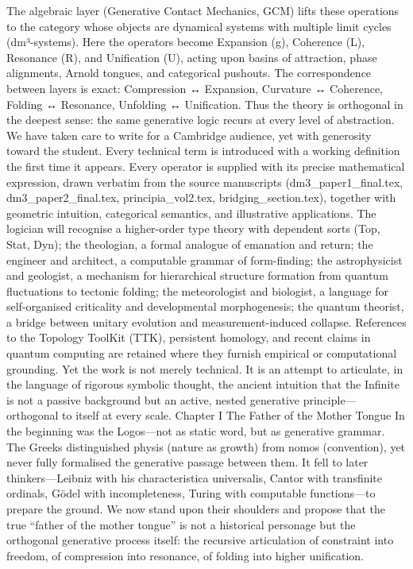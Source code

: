 The algebraic layer (Generative Contact Mechanics, GCM) lifts these operations to the category whose objects are dynamical systems with multiple limit cycles (dm³-systems). Here the operators become Expansion (g), Coherence (L), Resonance (R), and Unification (U), acting upon basins of attraction, phase alignments, Arnold tongues, and categorical pushouts. The correspondence between layers is exact: Compression ↔ Expansion, Curvature ↔ Coherence, Folding ↔ Resonance, Unfolding ↔ Unification. Thus the theory is orthogonal in the deepest sense: the same generative logic recurs at every level of abstraction.
We have taken care to write for a Cambridge audience, yet with generosity toward the student. Every technical term is introduced with a working definition the first time it appears. Every operator is supplied with its precise mathematical expression, drawn verbatim from the source manuscripts (dm3_paper1_final.tex, dm3_paper2_final.tex, principia_vol2.tex, bridging_section.tex), together with geometric intuition, categorical semantics, and illustrative applications. The logician will recognise a higher-order type theory with dependent sorts (Top, Stat, Dyn); the theologian, a formal analogue of emanation and return; the engineer and architect, a computable grammar of form-finding; the astrophysicist and geologist, a mechanism for hierarchical structure formation from quantum fluctuations to tectonic folding; the meteorologist and biologist, a language for self-organised criticality and developmental morphogenesis; the quantum theorist, a bridge between unitary evolution and measurement-induced collapse.
References to the Topology ToolKit (TTK), persistent homology, and recent claims in quantum computing are retained where they furnish empirical or computational grounding. Yet the work is not merely technical. It is an attempt to articulate, in the language of rigorous symbolic thought, the ancient intuition that the Infinite is not a passive background but an active, nested generative principle—orthogonal to itself at every scale.
Chapter I
The Father of the Mother Tongue
In the beginning was the Logos—not as static word, but as generative grammar. The Greeks distinguished physis (nature as growth) from nomos (convention), yet never fully formalised the generative passage between them. It fell to later thinkers—Leibniz with his characteristica universalis, Cantor with transfinite ordinals, Gödel with incompleteness, Turing with computable functions—to prepare the ground. We now stand upon their shoulders and propose that the true “father of the mother tongue” is not a historical personage but the orthogonal generative process itself: the recursive articulation of constraint into freedom, of compression into resonance, of folding into higher unification.
